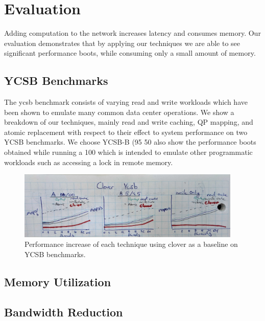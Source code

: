 \section{Evaluation}

Adding computation to the network increases latency and consumes memory. Our
evaluation demonstrates that by applying our techniques we are able to see
significant performance boots, while consuming only a small amount of memory.

\subsection{YCSB Benchmarks}

The ycsb benchmark consists of varying read and write workloads which have been
shown to emulate many common data center operations. We show a breakdown of our
techniques, mainly read and write caching, QP mapping, and atomic replacement
with respect to their effect to system performance on two YCSB benchmarks. We
choose YCSB-B (95%
50%
also show the performance boots obtained while running a 100%
which is intended to emulate other programmatic workloads such as accessing a
lock in remote memory.

\begin{figure}
    \includegraphics[width=0.95\textwidth]{fig/full_system_performance.jpg}
    \caption{{Performance increase of each technique using clover as a baseline on YCSB benchmarks.}}
    \label{fig:full_system_performance}
\end{figure}


\subsection{Memory Utilization}


\subsection{Bandwidth Reduction}

